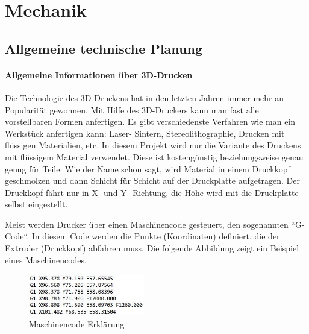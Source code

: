 \chapter{Mechanik}

\renewcommand{\kapitelautor}{Autor: Alexander Punz}

\section{Allgemeine technische Planung}

		\subsubsection{Allgemeine Informationen über 3D-Drucken}

		Die Technologie des 3D-Druckens hat in den letzten Jahren immer mehr an Popularität gewonnen.
		Mit Hilfe des 3D-Druckers kann man fast alle vorstellbaren Formen anfertigen.
		Es gibt verschiedenste Verfahren wie man ein Werkstück anfertigen kann: Laser- Sintern, Stereolithographie, Drucken mit flüssigen Materialien, etc.
		In diesem Projekt wird nur die Variante des Druckens mit flüssigem Material verwendet.
		Diese ist kostengünstig beziehungsweise genau genug für Teile. Wie der Name schon sagt, wird Material in einem Druckkopf geschmolzen und dann Schicht für Schicht auf der Druckplatte aufgetragen.
		Der Druckkopf fährt nur in X- und Y- Richtung, die Höhe wird mit die Druckplatte selbst eingestellt.

		Meist werden Drucker über einen Maschinencode gesteuert, den sogenannten “G-Code“. In diesem Code werden die Punkte (Koordinaten) definiert, die der Extruder (Druckkopf) abfahren muss.
		Die folgende Abbildung zeigt ein Beispiel eines Maschinencodes.

			\begin{figure}[tbh]
			\begin{centering}
			\includegraphics[width = 0.45\textwidth]{Bilder/gcode_erklaerung}
			\par\end{centering}
			\caption{Maschinencode Erklärung}
			\label{gcode_erklaerung}
			\end{figure}

